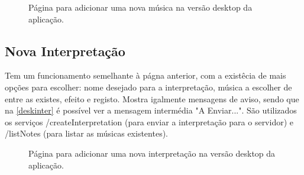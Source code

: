 \begin{figure}[htp]
\centering
{}
\caption{Página para adicionar uma nova música na versão desktop da aplicação.}
\label{desknova}
\end{figure}

\subsection{Nova Interpretação}
Tem um funcionamento semelhante à págna anterior, com a existêcia de mais opções para escolher: nome desejado para a interpretação, música a escolher de entre as existes, efeito e registo. Mostra igalmente mensagens de aviso, sendo que na \autoref{deskinter} é possível ver a mensagem intermédia "A Enviar...". São utilizados os serviços /createInterpretation (para enviar a interpretação para o servidor) e /listNotes (para listar as músicas existentes).

\begin{figure}[htp]
\centering
{}
\caption{Página para adicionar uma nova interpretação na versão desktop da aplicação.}
\label{deskinter}
\end{figure}

